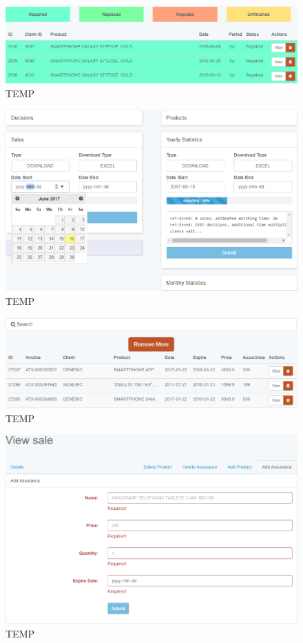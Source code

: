 	\begin{figure}
		\includegraphics[width=\linewidth]{../imagini/decisions_filter.png}
		\caption{TEMP}
		\label{fig:TEMP}
	\end{figure}
	\begin{figure}
		\includegraphics[width=\linewidth]{../imagini/reports.png}
		\caption{TEMP}
		\label{fig:TEMP}
	\end{figure}
	\begin{figure}
		\includegraphics[width=\linewidth]{../imagini/sales.png}
		\caption{TEMP}
		\label{fig:TEMP}
	\end{figure}
	\begin{figure}
		\includegraphics[width=\linewidth]{../imagini/sales_add_assurance.png}
		\caption{TEMP}
		\label{fig:TEMP}
	\end{figure}
